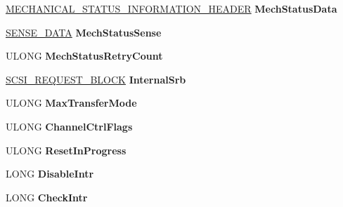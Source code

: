 \begin{DoxyCompactItemize}
\item 
\mbox{\label{struct___h_w___c_h_a_n_n_e_l_abf66b449875dfc9b13c2905444d4cf41}} 
\hyperlink{struct___m_e_c_h_a_n_i_c_a_l___s_t_a_t_u_s___i_n_f_o_r_m_a_t_i_o_n___h_e_a_d_e_r}{M\+E\+C\+H\+A\+N\+I\+C\+A\+L\+\_\+\+S\+T\+A\+T\+U\+S\+\_\+\+I\+N\+F\+O\+R\+M\+A\+T\+I\+O\+N\+\_\+\+H\+E\+A\+D\+ER} {\bfseries Mech\+Status\+Data}
\item 
\mbox{\label{struct___h_w___c_h_a_n_n_e_l_a11c09d70d42df760ca54c69ba93e8c2c}} 
\hyperlink{struct___s_e_n_s_e___d_a_t_a}{S\+E\+N\+S\+E\+\_\+\+D\+A\+TA} {\bfseries Mech\+Status\+Sense}
\item 
\mbox{\label{struct___h_w___c_h_a_n_n_e_l_a0a547116ca1cb44454df78ef66df03f4}} 
U\+L\+O\+NG {\bfseries Mech\+Status\+Retry\+Count}
\item 
\mbox{\label{struct___h_w___c_h_a_n_n_e_l_a249c678446808948f7a0937a25c2de8b}} 
\hyperlink{struct___s_c_s_i___r_e_q_u_e_s_t___b_l_o_c_k}{S\+C\+S\+I\+\_\+\+R\+E\+Q\+U\+E\+S\+T\+\_\+\+B\+L\+O\+CK} {\bfseries Internal\+Srb}
\item 
\mbox{\label{struct___h_w___c_h_a_n_n_e_l_af70dd9f288759e0e5f32cbc7b933ebf6}} 
U\+L\+O\+NG {\bfseries Max\+Transfer\+Mode}
\item 
\mbox{\label{struct___h_w___c_h_a_n_n_e_l_a086ce6240d49e03a80bf267389b6e105}} 
U\+L\+O\+NG {\bfseries Channel\+Ctrl\+Flags}
\item 
\mbox{\label{struct___h_w___c_h_a_n_n_e_l_aee7eb615018d2a6566ec7a0298636038}} 
U\+L\+O\+NG {\bfseries Reset\+In\+Progress}
\item 
\mbox{\label{struct___h_w___c_h_a_n_n_e_l_a5e50f5b91c827481ba6f730fbd3f263f}} 
L\+O\+NG {\bfseries Disable\+Intr}
\item 
\mbox{\label{struct___h_w___c_h_a_n_n_e_l_a13d2f6a2af69bcee78ea781270a7df6c}} 
L\+O\+NG {\bfseries Check\+Intr}
\item 

\end{DoxyCompactItemize}

